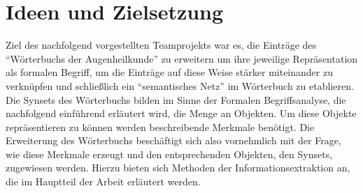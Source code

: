 \documentclass[pagesize,paper=A4,DIV=calc,fontsize=12pt,draft=false]{scrreprt}
\begin{document}
\section{Ideen und Zielsetzung}

Ziel des nachfolgend vorgestellten Teamprojekts war es, die Einträge des \enquote{Wörterbuchs der Augenheilkunde} zu erweitern um ihre jeweilige Repräsentation als formalen Begriff, um die Einträge auf diese Weise stärker miteinander zu verknüpfen und schließlich ein \enquote{semantisches Netz} im Wörterbuch zu etablieren. 
Die Synsets des Wörterbuchs bilden im Sinne der Formalen Begriffsanalyse, die nachfolgend einführend erläutert wird, die Menge an Objekten. 
Um diese Objekte repräsentieren zu können werden beschreibende Merkmale benötigt. 
Die Erweiterung des Wörterbuchs beschäftigt sich also vornehmlich mit der Frage, wie diese Merkmale erzeugt und den entsprechenden Objekten, den Synsets, zugewiesen werden. 
Hierzu bieten sich Methoden der Informationsextraktion an, die im Hauptteil der Arbeit erläutert werden. 
\end{document}
